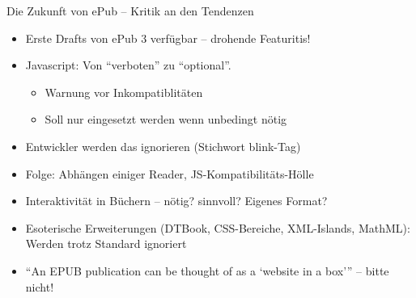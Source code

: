 \begin{frame}{Die Zukunft von ePub -- Kritik an den Tendenzen}
	\begin{itemize}
		\item Erste Drafts von ePub 3 verfügbar -- drohende Featuritis!
		\item<2-> Javascript: Von "`verboten"' zu "`optional"'. 
		\begin{itemize}
			\item Warnung vor Inkompatiblitäten
			\item Soll nur eingesetzt werden wenn unbedingt nötig
		\end{itemize}
		\item<3-> Entwickler werden das ignorieren (Stichwort blink-Tag)
		\item<3-> Folge: Abhängen einiger Reader, JS-Kompatibilitäts-Hölle
		\item<4-> Interaktivität in Büchern -- nötig? sinnvoll? Eigenes Format?
		\item<5-> Esoterische Erweiterungen (DTBook, CSS-Bereiche, XML-Islands, MathML): Werden trotz Standard ignoriert
		\item<6-> "`An EPUB publication can be thought of as a `website in a box'"' -- bitte nicht!
	\end{itemize}
\end{frame}

